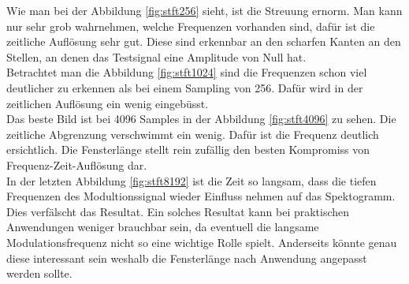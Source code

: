 Wie man bei der Abbildung \ref{fig:stft256} sieht, ist die Streuung ernorm. Man kann nur sehr grob wahrnehmen, welche Frequenzen vorhanden sind, dafür ist die zeitliche Auflösung sehr gut. Diese sind erkennbar an den scharfen Kanten an den Stellen, an denen das Testsignal eine Amplitude von Null hat. \\

Betrachtet man die Abbildung \ref{fig:stft1024} sind die Frequenzen schon viel deutlicher zu erkennen als bei einem Sampling von 256. Dafür wird in der zeitlichen Auflösung ein wenig eingebüsst.\\

Das beste Bild ist bei 4096 Samples in der Abbildung \ref{fig:stft4096} zu sehen. Die zeitliche Abgrenzung verschwimmt ein wenig. Dafür ist die Frequenz deutlich ersichtlich. Die Fensterlänge stellt rein zufällig den besten Kompromiss von Frequenz-Zeit-Auflösung dar.\\

In der letzten Abbildung \ref{fig:stft8192} ist die Zeit so langsam, dass die tiefen Frequenzen des Modultionssignal wieder Einfluss nehmen auf das Spektogramm. Dies verfälscht das Resultat. Ein solches Resultat kann bei praktischen Anwendungen weniger brauchbar sein, da eventuell die  langsame Modulationsfrequenz nicht so eine wichtige Rolle spielt. Anderseits könnte genau diese interessant sein weshalb die Fensterlänge nach Anwendung angepasst werden sollte.\\
\newpage





